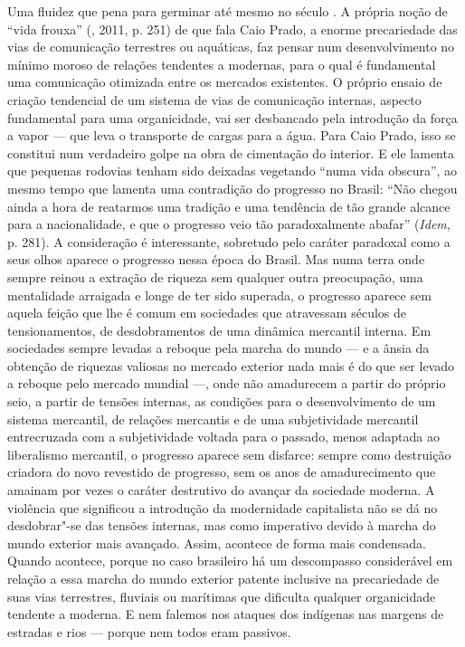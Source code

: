 Uma fluidez que pena para germinar até mesmo no século . A própria
noção de ``vida frouxa'' (, 2011, p. 251) de que fala Caio Prado,
a enorme precariedade das vias de comunicação terrestres ou aquáticas,
faz pensar num desenvolvimento no mínimo moroso de relações tendentes a
modernas, para o qual é fundamental uma comunicação otimizada entre os
mercados existentes. O próprio ensaio de criação tendencial de um
sistema de vias de comunicação internas, aspecto fundamental para uma
organicidade, vai ser desbancado pela introdução da força a vapor --- que
leva o transporte de cargas para a água. Para Caio Prado, isso se
constitui num verdadeiro golpe na obra de cimentação do interior. E ele
lamenta que pequenas rodovias tenham sido deixadas vegetando ``numa vida
obscura'', ao mesmo tempo que lamenta uma contradição do progresso no
Brasil: ``Não chegou ainda a hora de reatarmos uma tradição e uma
tendência de tão grande alcance para a nacionalidade, e que o progresso
veio tão paradoxalmente abafar'' (\emph{Idem}, p. 281). A consideração é
interessante, sobretudo pelo caráter paradoxal como a seus olhos aparece
o progresso nessa época do Brasil. Mas numa terra onde sempre reinou a
extração de riqueza sem qualquer outra preocupação, uma mentalidade
arraigada e longe de ter sido superada, o progresso aparece sem aquela
feição que lhe é comum em sociedades que atravessam séculos de
tensionamentos, de desdobramentos de uma dinâmica mercantil interna. Em
sociedades sempre levadas a reboque pela marcha do mundo --- e a ânsia da
obtenção de riquezas valiosas no mercado exterior nada mais é do que ser
levado a reboque pelo mercado mundial ---, onde não amadurecem a partir
do próprio seio, a partir de tensões internas, as condições para o
desenvolvimento de um sistema mercantil, de relações mercantis e de uma
subjetividade mercantil entrecruzada com a subjetividade voltada para o
passado, menos adaptada ao liberalismo mercantil, o progresso aparece
sem disfarce: sempre como destruição criadora do novo revestido de
progresso, sem os anos de amadurecimento que amainam por vezes o caráter
destrutivo do avançar da sociedade moderna. A violência que significou a
introdução da modernidade capitalista não se dá no desdobrar"-se das
tensões internas, mas como imperativo devido à marcha do mundo exterior
mais avançado. Assim, acontece de forma mais condensada. Quando
acontece, porque no caso brasileiro há um descompasso considerável em
relação a essa marcha do mundo exterior patente inclusive na
precariedade de suas vias terrestres, fluviais ou marítimas que
dificulta qualquer organicidade tendente a moderna. E nem falemos nos
ataques dos indígenas nas margens de estradas e rios --- porque nem todos
eram passivos.

